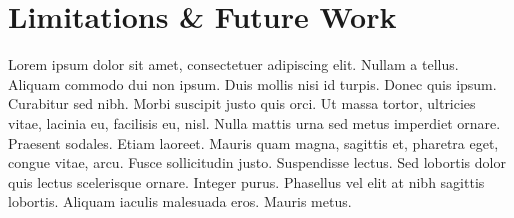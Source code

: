 \chapter{Limitations \& Future Work}
\label{c:limitations} Lorem ipsum dolor sit amet, consectetuer adipiscing
elit. Nullam a tellus. Aliquam commodo dui non ipsum. Duis mollis nisi id
turpis. Donec quis ipsum. Curabitur sed nibh. Morbi suscipit justo quis orci.
Ut massa tortor, ultricies vitae, lacinia eu, facilisis eu, nisl. Nulla mattis
urna sed metus imperdiet ornare. Praesent sodales. Etiam laoreet. Mauris quam
magna, sagittis et, pharetra eget, congue vitae, arcu. Fusce sollicitudin
justo. Suspendisse lectus. Sed lobortis dolor quis lectus scelerisque ornare.
Integer purus. Phasellus vel elit at nibh sagittis lobortis. Aliquam iaculis
malesuada eros. Mauris metus.
